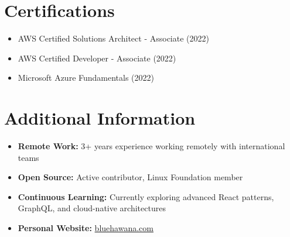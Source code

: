 \documentclass[11pt,a4paper]{article}
\begin{document}
\section*{Certifications}
\begin{itemize}[noitemsep]
\item AWS Certified Solutions Architect - Associate (2022)
\item AWS Certified Developer - Associate (2022)
\item Microsoft Azure Fundamentals (2022)
\end{itemize}

\section*{Additional Information}
\begin{itemize}[noitemsep]
\item \textbf{Remote Work:} 3+ years experience working remotely with international teams
\item \textbf{Open Source:} Active contributor, Linux Foundation member
\item \textbf{Continuous Learning:} Currently exploring advanced React patterns, GraphQL, and cloud-native architectures
\item \textbf{Personal Website:} \href{https://www.bluehawana.com}{bluehawana.com}
\end{itemize}
\end{document}
